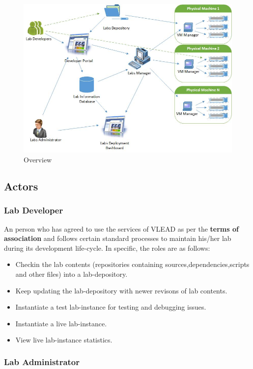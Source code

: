 \documentclass[11pt]{article}
\begin{document}
   \begin{figure}[htb]
\centering
\includegraphics[width=16cm]{overview.jpg}
\caption{Overview}
\end{figure}
\subsection{Actors}
\label{sec-3.1}

\subsubsection{Lab Developer}
\label{sec-3.1.1}

   An person who has agreed to use the services of VLEAD as per the
   \textbf{terms of association} and follows certain standard processes to
   maintain his/her lab during its development life-cycle. In
   specific, the roles are as follows:
\begin{itemize}
\item Checkin the lab contents (repositories containing
       sources,dependencies,scripts and other files) into a
       lab-depository.
\item Keep updating the lab-depository with newer revisons of lab contents.
\item Instantiate a test lab-instance for testing and debugging issues.
\item Instantiate a live lab-instance.
\item View live lab-instance statistics.
\end{itemize}
\subsubsection{Lab Administrator}
\label{sec-3.1.2}
\end{document}
